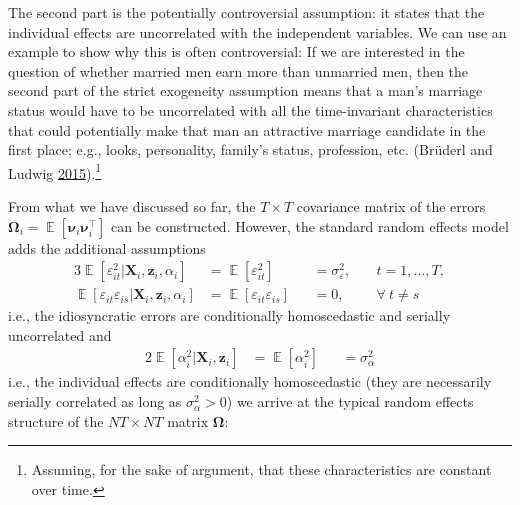 \documentclass[
  12pt,
  a4paper]{article}
\DeclareMathOperator{\E}{\mathbb{E}}
\begin{document}
The second part is the potentially controversial assumption: it states
that the individual effects are uncorrelated with the independent
variables. We can use an example to show why this is often
controversial: If we are interested in the question of whether married
men earn more than unmarried men, then the second part of the strict
exogeneity assumption means that a man's marriage status would have to
be uncorrelated with all the time-invariant characteristics that could
potentially make that man an attractive marriage candidate in the first
place; e.g., looks, personality, family's status, profession, etc.
(Brüderl and Ludwig
\protect\hyperlink{ref-Bruederl2015}{2015}).\footnote{Assuming, for the
  sake of argument, that these characteristics are constant over time.}

From what we have discussed so far, the \(T \times T\) covariance matrix
of the errors
\(\bm{\Omega}_{i} = \E[\bm{\nu}_{i}\bm{\nu}_{i}^{\intercal}]\) can be
constructed. However, the standard random effects model adds the
additional assumptions \begin{alignat}{3}
\E[\varepsilon_{it}^{2} | \bm{X}_{i}, \bm{z}_{i}, \alpha_{i}] & = \E[\varepsilon_{it}^{2}] && = \sigma_{\varepsilon}^{2}, && \ t = 1, ..., T, \\
\E[\varepsilon_{it}\varepsilon_{is}| \bm{X}_{i}, \bm{z}_{i}, \alpha_{i}] & = \E[\varepsilon_{it}\varepsilon_{is}] && = 0, && \ \forall \ t \ne s 
\end{alignat} i.e., the idiosyncratic errors are conditionally
homoscedastic and serially uncorrelated and \begin{alignat}{2}
\E[\alpha_{i}^{2}| \bm{X}_{i},\bm{z}_{i}] & = \E[\alpha_{i}^{2}] && = \sigma^{2}_{\alpha}
\end{alignat} i.e., the individual effects are conditionally
homoscedastic (they are necessarily serially correlated as long as
\(\sigma_{\alpha}^{2} > 0\)) we arrive at the typical random effects
structure of the \(NT \times NT\) matrix \(\bm{\Omega}\):
\end{document}
